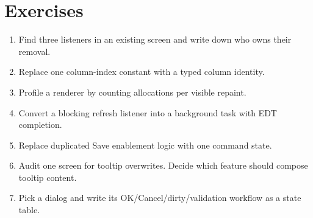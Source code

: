 \section{Exercises}

\begin{exercisebox}
\begin{enumerate}
\item Find three listeners in an existing screen and write down who owns their removal.
\item Replace one column-index constant with a typed column identity.
\item Profile a renderer by counting allocations per visible repaint.
\item Convert a blocking refresh listener into a background task with EDT completion.
\item Replace duplicated Save enablement logic with one command state.
\item Audit one screen for tooltip overwrites. Decide which feature should compose tooltip content.
\item Pick a dialog and write its OK/Cancel/dirty/validation workflow as a state table.
\end{enumerate}
\end{exercisebox}
